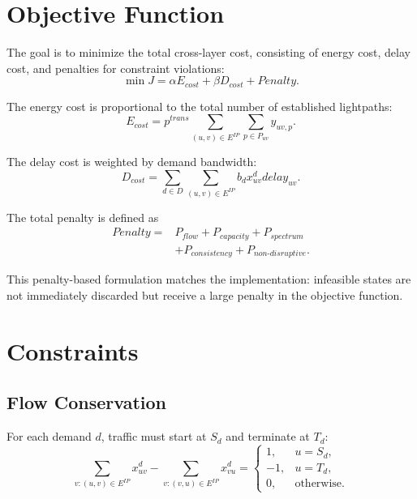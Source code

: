 \documentclass[journal,10pt]{IEEEtran}
\begin{document}
\section{Objective Function}

The goal is to minimize the total cross-layer cost, consisting of energy cost, delay cost, and penalties for constraint violations:
\begin{equation}
    \min J = \alpha E_{cost} + \beta D_{cost} + Penalty.
    \label{eq:objective}
\end{equation}

The energy cost is proportional to the total number of established lightpaths:
\begin{equation}
    E_{cost}
    = p^{trans}
    \sum_{(u,v)\in E^{IP}}
    \sum_{p\in P_{uv}}
    y_{uv,p}.
    \label{eq:energy}
\end{equation}

The delay cost is weighted by demand bandwidth:
\begin{equation}
    D_{cost}
    =
    \sum_{d\in D}
    \sum_{(u,v)\in E^{IP}}
    b_d x^{d}_{uv} delay_{uv}.
    \label{eq:delay}
\end{equation}

The total penalty is defined as
\begin{equation}
\begin{split}
    Penalty ={}& P_{flow} + P_{capacity} + P_{spectrum} \\
               &+ P_{consistency} + P_{non\text{-}disruptive}.
\end{split}
\label{eq:penalty}
\end{equation}

This penalty-based formulation matches the implementation: infeasible states are not immediately discarded but receive a large penalty in the objective function.

\section{Constraints}

\subsection{Flow Conservation}

For each demand $d$, traffic must start at $S_d$ and terminate at $T_d$:
\begin{equation}
    \sum_{v:(u,v)\in E^{IP}} x^{d}_{uv}
    -
    \sum_{v:(v,u)\in E^{IP}} x^{d}_{vu}
    =
    \begin{cases}
        1, & u = S_d,\\
       -1, & u = T_d,\\
        0, & \text{otherwise.}
    \end{cases}
    \label{eq:flow}
\end{equation}
\end{document}
